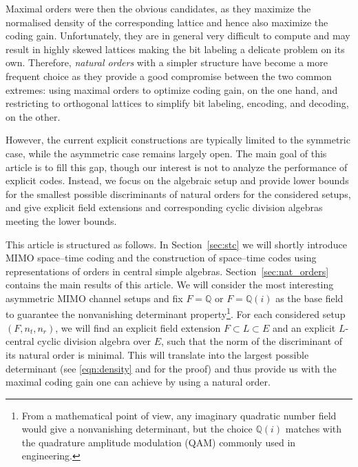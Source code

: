 \documentclass[smallextended]{svjour3}
\newcommand{\Q}{\mathbb{Q}}
\begin{document}


Maximal orders were then the obvious candidates, as they maximize the normalised density of the corresponding lattice and hence also maximize the coding gain. Unfortunately, they are in general  very difficult to compute and may result in highly skewed lattices making the bit labeling a delicate problem on its own. Therefore, \emph{natural orders} with a simpler structure have become a more frequent choice as they provide a good compromise between the two common extremes: using maximal orders to optimize coding gain, on the one hand, and restricting to orthogonal lattices to simplify bit labeling, encoding, and decoding, on the other.  





However, the current explicit constructions are typically limited to the symmetric case, while the asymmetric case remains largely open. The main goal of this article is to fill this gap,
though our interest is not to analyze the performance of explicit codes. Instead, we focus on the algebraic setup and provide lower bounds for the smallest possible discriminants of natural orders for the considered setups, and give explicit field extensions and corresponding cyclic division algebras meeting the lower bounds. 

This article is structured as follows. In Section~\ref{sec:stc} we will shortly introduce MIMO space--time coding and the construction of space--time codes using representations of orders in central simple algebras. Section~\ref{sec:nat_orders} contains the main results of this article. We will consider the most interesting asymmetric MIMO channel setups and fix $F = \Q$ or $F = \Q(i)$ as the base field to guarantee the nonvanishing determinant property\footnote{From a mathematical point of view, any imaginary quadratic number field would give a nonvanishing determinant, but the choice $\Q(i)$ matches with the quadrature amplitude modulation (QAM) commonly used in engineering.}. For each considered setup $(F, n_t, n_r)$, we will find an explicit field extension $F \subset L \subset E$ and an explicit $L$-central cyclic division algebra over $E$, such that the norm of the discriminant of its natural order is minimal. This will translate into the largest possible determinant (see \eqref{eqn:density} and \cite{VHLR,HL} for the proof) and thus provide us with the maximal coding gain one can achieve by using a natural order. 
\end{document}
